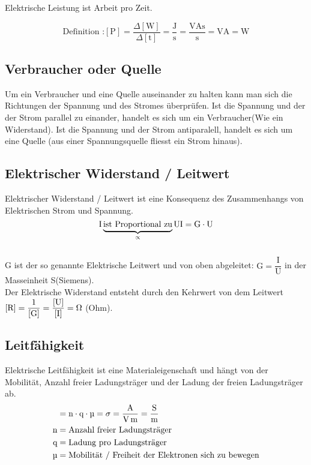 Elektrische Leistung ist Arbeit pro Zeit.

\[ \text{Definition :} [\text{P}] = \frac{\Delta[\text{W}]}{\Delta[\text{t}]} = \frac{\unit{\joule}}{\unit{\second}} = \frac{\unit{\volt\ampere\second}}{\unit{\second}} = \unit{\volt\ampere} = \unit{\watt} \]

\subsection{Verbraucher oder Quelle} \label{source_sink}

Um ein Verbraucher und eine Quelle auseinander zu halten kann man sich die Richtungen der Spannung und des Stromes überprüfen. Ist die Spannung  und der der Strom parallel zu einander, handelt es sich um ein Verbraucher(Wie ein Widerstand). Ist die Spannung und der Strom antiparalell, handelt es sich um eine Quelle (aus einer Spannungsquelle fliesst ein Strom hinaus).\\

\begin{center}
    
\end{center}    

\subsection{Elektrischer Widerstand / Leitwert}

Elektrischer Widerstand / Leitwert ist eine Konsequenz des Zusammenhangs von Elektrischen Strom und Spannung. 
\[\text{I}   \underbrace{\text{ist Proportional zu}}_\propto{}   \text{U} \\ \text{I} = \text{G}\cdot\text{U}\]\\
G ist der so genannte Elektrische Leitwert und von oben abgeleitet: $\text{G} = \dfrac{\text{I}}{\text{U}}$ in der Masseinheit \unit{\siemens}(Siemens).\\
Der Elektrische Widerstand entsteht durch den Kehrwert von dem Leitwert $[\text{R}] = \dfrac{1}{[\text{G}]} = \dfrac{\text{[\text{U}]}}{[\text{I}]} = \unit{\ohm} $ (Ohm).\\

\subsection{Leitfähigkeit}

Elektrische Leitfähigkeit ist eine Materialeigenschaft und hängt von der Mobilität, Anzahl freier Ladungsträger und der Ladung der freien Ladungsträger ab.\\
\begin{align*}
    [\text{Leitfähigkeit}]& = \text{n}\cdot\text{q}\cdot\text{\textmu} = \sigma = \unit[per-mode=fraction]{\ampere\per\volt\per\meter} = \unit[per-mode=fraction]{\siemens\per\meter}\\
    \text{n}& = \text{Anzahl freier Ladungsträger}\\
    \text{q}& = \text{Ladung pro Ladungsträger}\\
    \text{\textmu}& = \text{Mobilität / Freiheit der Elektronen sich zu bewegen}\\
\end{align*}


